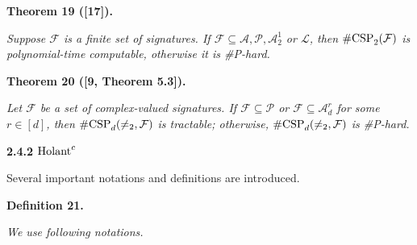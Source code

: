

\par\medskip\noindent\textbf{
\textbf{Theorem 19}\textbf{ }([17])\textbf{.}
}\par



\emph{Suppose $\mathcal{F}$ is a finite set of signatures. If $\mathcal{F}\subseteq\mathscr{A},\mathscr{P},\mathscr{A}_{2}^{1}$ or $\mathscr{L}$, then $\textup{{\#CSP}}_{2}(\mathcal{F})$ is polynomial-time computable, otherwise it is \#P-hard.}\par







\par\medskip\noindent\textbf{
\textbf{Theorem 20}\textbf{ }([9, Theorem 5.3])\textbf{.}
}\par



\emph{Let $\mathcal{F}$ be a set of complex-valued signatures. If $\mathcal{F}\subseteq\mathscr{P}$ or $\mathcal{F}\subseteq\mathscr{A}_{d}^{r}$ for some $r\in[d]$, then $\textup{{\#CSP}}_{d}(\neq_{2},\mathcal{F})$ is tractable; otherwise, $\textup{{\#CSP}}_{d}(\neq_{2},\mathcal{F})$ is \#P-hard.}\par







\par\medskip\noindent\textbf{
2.4.2 $\textup{{Holant}}^{c}$
}\par




Several important notations and definitions are introduced.\par





\par\medskip\noindent\textbf{
\textbf{Definition 21}\textbf{.}
}\par



\emph{We use following notations.}\par


